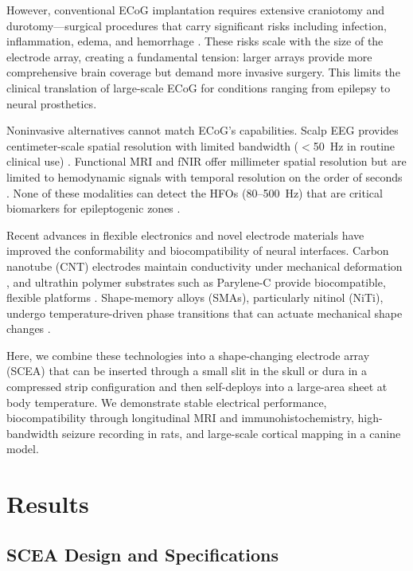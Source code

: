 \documentclass[11pt]{article}
\begin{document}
However, conventional ECoG implantation requires extensive craniotomy and durotomy---surgical procedures that carry significant risks including infection, inflammation, edema, and hemorrhage \citep{lesser2010subdural}. These risks scale with the size of the electrode array, creating a fundamental tension: larger arrays provide more comprehensive brain coverage but demand more invasive surgery. This limits the clinical translation of large-scale ECoG for conditions ranging from epilepsy to neural prosthetics.

Noninvasive alternatives cannot match ECoG's capabilities. Scalp EEG provides centimeter-scale spatial resolution with limited bandwidth ($<$50~Hz in routine clinical use) \citep{buzsaki2012origin}. Functional MRI and fNIR offer millimeter spatial resolution but are limited to hemodynamic signals with temporal resolution on the order of seconds \citep{fox2009column}. None of these modalities can detect the HFOs (80--500~Hz) that are critical biomarkers for epileptogenic zones \citep{jacobs2009high}.

Recent advances in flexible electronics \citep{rogers2010materials, kim2010dissolvable} and novel electrode materials \citep{wang2019graphene, cogan2008neural} have improved the conformability and biocompatibility of neural interfaces. Carbon nanotube (CNT) electrodes maintain conductivity under mechanical deformation \citep{elgamal2014carbon}, and ultrathin polymer substrates such as Parylene-C provide biocompatible, flexible platforms \citep{luo2023parylene}. Shape-memory alloys (SMAs), particularly nitinol (NiTi), undergo temperature-driven phase transitions that can actuate mechanical shape changes \citep{jang2019nitinol}.

Here, we combine these technologies into a shape-changing electrode array (SCEA) that can be inserted through a small slit in the skull or dura in a compressed strip configuration and then self-deploys into a large-area sheet at body temperature. We demonstrate stable electrical performance, biocompatibility through longitudinal MRI and immunohistochemistry, high-bandwidth seizure recording in rats, and large-scale cortical mapping in a canine model.

\section{Results}

\subsection{SCEA Design and Specifications}
\end{document}
